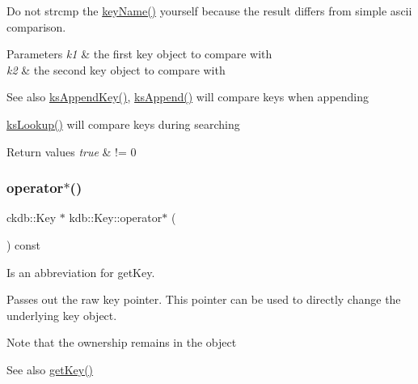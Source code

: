 Do not strcmp the \mbox{\hyperlink{group__keyname_ga8e805c726a60da921d3736cda7813513}{key\+Name()}} yourself because the result differs from simple ascii comparison.


\begin{DoxyParams}{Parameters}
{\em k1} & the first key object to compare with \\
\hline
{\em k2} & the second key object to compare with\\
\hline
\end{DoxyParams}
\begin{DoxySeeAlso}{See also}
\mbox{\hyperlink{group__keyset_gaa5a1d467a4d71041edce68ea7748ce45}{ks\+Append\+Key()}}, \mbox{\hyperlink{group__keyset_ga21eb9c3a14a604ee3a8bdc779232e7b7}{ks\+Append()}} will compare keys when appending 

\mbox{\hyperlink{group__keyset_gaa34fc43a081e6b01e4120daa6c112004}{ks\+Lookup()}} will compare keys during searching
\end{DoxySeeAlso}

\begin{DoxyRetVals}{Return values}
{\em true} & != 0 \\
\hline
\end{DoxyRetVals}
\mbox{\label{classkdb_1_1Key_a66e5af2387ebb86efa465ba2e844cafd}} 
\subsubsection{\texorpdfstring{operator$\ast$()}{operator*()}}
{\footnotesize\ttfamily ckdb\+::\+Key $\ast$ kdb\+::\+Key\+::operator$\ast$ (\begin{DoxyParamCaption}{ }\end{DoxyParamCaption}) const\hspace{0.3cm}{\ttfamily [inline]}}



Is an abbreviation for get\+Key. 

Passes out the raw key pointer. This pointer can be used to directly change the underlying key object.

\begin{DoxyNote}{Note}
that the ownership remains in the object
\end{DoxyNote}
\begin{DoxySeeAlso}{See also}
\mbox{\hyperlink{classkdb_1_1Key_a6be9b3bb17434fd4362d137183d51100}{get\+Key()}} 
\end{DoxySeeAlso}
\mbox{\label{classkdb_1_1Key_a1e3c8da218a6a6e9f832f70772bcdc6f}} 
